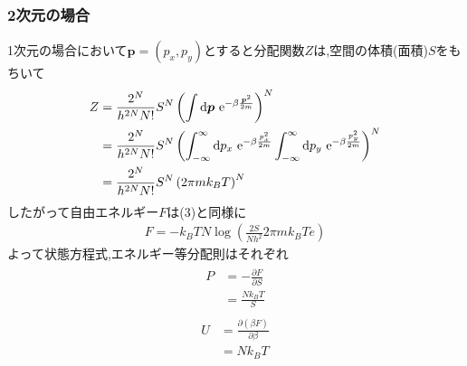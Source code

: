 \subsubsection*{2次元の場合}
1次元の場合において$\bm{p}=(p_x,p_y)$とすると分配関数$Z$は,空間の体積(面積)$S$をもちいて
\begin{align}
  \begin{split}
    Z&=\frac{2^N}{h^{2N}N!}S^N\left(\int{\rm d}\bm{p}\ {\rm e}^{-\beta\frac{\bm{p}^2}{2m}}\right)^N\\
    &=\frac{2^N}{h^{2N}N!}S^N\left(\int_{-\infty}^{\infty}{\rm d}p_x\ {\rm e}^{-\beta\frac{p_x^2}{2m}}\int_{-\infty}^{\infty}{\rm d}p_y\ {\rm e}^{-\beta\frac{p_y^2}{2m}}\right)^N\\
    &=\frac{2^N}{h^{2N}N!}S^N\left(2\pi mk_BT\right)^N
  \end{split}
\end{align}
したがって自由エネルギー$F$は(3)と同様に
\begin{align}
  F=-k_BTN\log\left(\frac{2S}{Nh^2}2\pi mk_BTe\right)
\end{align}
よって状態方程式,エネルギー等分配則はそれぞれ
\begin{align}
  \begin{split}
    P&=-\frac{\partial F}{\partial S}\\
    &=\frac{Nk_BT}{S}
  \end{split}
\end{align}
\begin{align}
  \begin{split}
    U&=\frac{\partial(\beta F)}{\partial \beta}\\
    &=Nk_BT
  \end{split}
\end{align}
